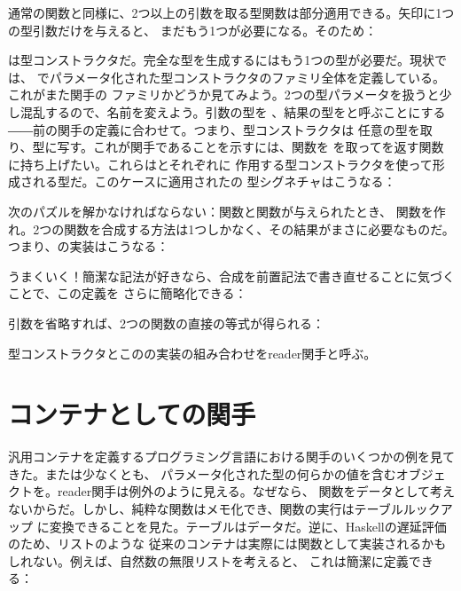 通常の関数と同様に、2つ以上の引数を取る型関数は部分適用できる。矢印に1つの型引数だけを与えると、
まだもう1つが必要になる。そのため：

は型コンストラクタだ。完全な型を生成するにはもう1つの型が必要だ。現状では、
でパラメータ化された型コンストラクタのファミリ全体を定義している。これがまた関手の
ファミリかどうか見てみよう。2つの型パラメータを扱うと少し混乱するので、名前を変えよう。引数の型を
、結果の型をと呼ぶことにする――前の関手の定義に合わせて。つまり、型コンストラクタは
任意の型を取り、型に写す。これが関手であることを示すには、関数を
を取ってを返す関数に持ち上げたい。これらはとそれぞれに
作用する型コンストラクタを使って形成される型だ。このケースに適用されたの
型シグネチャはこうなる：

次のパズルを解かなければならない：関数と関数が与えられたとき、
関数を作れ。2つの関数を合成する方法は1つしかなく、その結果がまさに必要なものだ。
つまり、の実装はこうなる：

うまくいく！簡潔な記法が好きなら、合成を前置記法で書き直せることに気づくことで、この定義を
さらに簡略化できる：

引数を省略すれば、2つの関数の直接の等式が得られる：

型コンストラクタとこのの実装の組み合わせをreader関手と呼ぶ。

\section{コンテナとしての関手}

汎用コンテナを定義するプログラミング言語における関手のいくつかの例を見てきた。または少なくとも、
パラメータ化された型の何らかの値を含むオブジェクトを。reader関手は例外のように見える。なぜなら、
関数をデータとして考えないからだ。しかし、純粋な関数はメモ化でき、関数の実行はテーブルルックアップ
に変換できることを見た。テーブルはデータだ。逆に、Haskellの遅延評価のため、リストのような
従来のコンテナは実際には関数として実装されるかもしれない。例えば、自然数の無限リストを考えると、
これは簡潔に定義できる：

